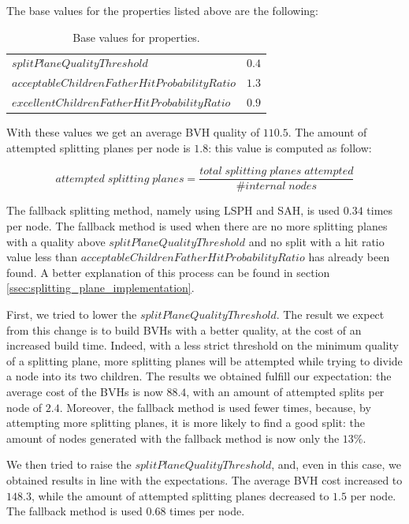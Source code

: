 \documentclass{PoliMi_MasterThesis}
\begin{document}
The base values for the properties listed above are the following:

\begin{table}[H]
    \centering
    \begin{tabular}{|l|c|}
		\hline
        \boldmath$splitPlaneQualityThreshold$ & $0.4$\\
		\boldmath$acceptableChildrenFatherHitProbabilityRatio$ & $1.3$\\
		\boldmath$excellentChildrenFatherHitProbabilityRatio$ & $0.9$\\
		\hline
    \end{tabular}
	\caption{Base values for properties.}
	\label{tab:standard_properties}
\end{table}

With these values we get an average BVH quality of $110.5$. The amount of attempted splitting planes per node is $1.8$: this value is computed as follow: 

$$attempted \; splitting \; planes = \frac{total\;splitting\;planes\;attempted}{\#internal\;nodes}$$

The fallback splitting method, namely using LSPH and SAH, is used $0.34$ times per node. The fallback method is used when there are no more splitting planes with a quality above $splitPlaneQualityThreshold$ and no split with a hit ratio value less than $acceptableChildrenFatherHitProbabilityRatio$ has already been found. A better explanation of this process can be found in section \ref{ssec:splitting_plane_implementation}.

First, we tried to lower the $splitPlaneQualityThreshold$. The result we expect from this change is to build BVHs with a better quality, at the cost of an increased build time. Indeed, with a less strict threshold on the minimum quality of a splitting plane, more splitting planes will be attempted while trying to divide a node into its two children. The results we obtained fulfill our expectation: the average cost of the BVHs is now $88.4$, with an amount of attempted splits per node of $2.4$. Moreover, the fallback method is used fewer times, because, by attempting more splitting planes, it is more likely to find a good split: the amount of nodes generated with the fallback method is now only the $13\%$.

We then tried to raise the $splitPlaneQualityThreshold$, and, even in this case, we obtained results in line with the expectations. The average BVH cost increased to $148.3$, while the amount of attempted splitting planes decreased to $1.5$ per node. The fallback method is used $0.68$ times per node.
\end{document}
